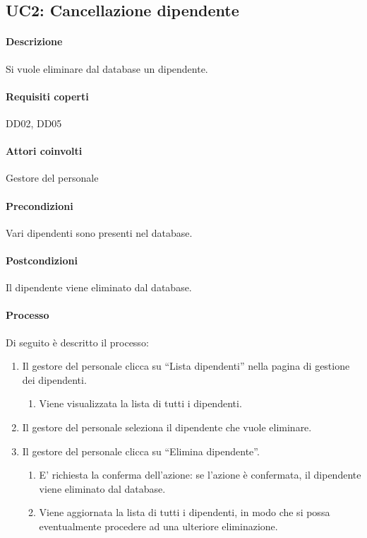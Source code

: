 \subsection{UC2: Cancellazione dipendente}
\paragraph{Descrizione}
Si vuole eliminare dal database un dipendente.
\paragraph{Requisiti coperti}
DD02, DD05
\paragraph{Attori coinvolti}
Gestore del personale
\paragraph{Precondizioni}
Vari dipendenti sono presenti nel database.
\paragraph{Postcondizioni}
Il dipendente viene eliminato dal database.
\paragraph{Processo}
Di seguito è descritto il processo:
\begin{enumerate}
	\item Il gestore del personale clicca su “Lista dipendenti” nella pagina di gestione dei dipendenti.
		\begin{enumerate}
			\item Viene visualizzata la lista di tutti i dipendenti.
		\end{enumerate}
	\item Il gestore del personale seleziona il dipendente che vuole eliminare. 
	\item Il gestore del personale clicca su “Elimina dipendente”. 
		\begin{enumerate}
			\item E' richiesta la conferma dell’azione: se l’azione è confermata, il dipendente viene eliminato dal database.
			\item Viene aggiornata la lista di tutti i dipendenti, in modo che si possa eventualmente procedere ad una ulteriore eliminazione.	
		\end{enumerate}
\end{enumerate}

